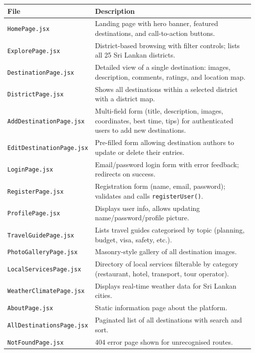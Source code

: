 \documentclass[12pt,a4paper]{report}
\begin{document}
\begin{longtable}{lp{9cm}}
  \toprule
  \textbf{File} & \textbf{Description} \\
  \midrule
  \texttt{HomePage.jsx} & Landing page with hero banner, featured destinations, and call-to-action buttons. \\
  \texttt{ExplorePage.jsx} & District-based browsing with filter controls; lists all 25 Sri Lankan districts. \\
  \texttt{DestinationPage.jsx} & Detailed view of a single destination: images, description, comments, ratings, and location map. \\
  \texttt{DistrictPage.jsx} & Shows all destinations within a selected district with a district map. \\
  \texttt{AddDestinationPage.jsx} & Multi-field form (title, description, images, coordinates, best time, tips) for authenticated users to add new destinations. \\
  \texttt{EditDestinationPage.jsx} & Pre-filled form allowing destination authors to update or delete their entries. \\
  \texttt{LoginPage.jsx} & Email/password login form with error feedback; redirects on success. \\
  \texttt{RegisterPage.jsx} & Registration form (name, email, password); validates and calls \texttt{registerUser()}. \\
  \texttt{ProfilePage.jsx} & Displays user info, allows updating name/password/profile picture. \\
  \texttt{TravelGuidePage.jsx} & Lists travel guides categorised by topic (planning, budget, visa, safety, etc.). \\
  \texttt{PhotoGalleryPage.jsx} & Masonry-style gallery of all destination images. \\
  \texttt{LocalServicesPage.jsx} & Directory of local services filterable by category (restaurant, hotel, transport, tour operator). \\
  \texttt{WeatherClimatePage.jsx} & Displays real-time weather data for Sri Lankan cities. \\
  \texttt{AboutPage.jsx} & Static information page about the platform. \\
  \texttt{AllDestinationsPage.jsx} & Paginated list of all destinations with search and sort. \\
  \texttt{NotFoundPage.jsx} & 404 error page shown for unrecognised routes. \\
  \bottomrule
\end{longtable}
\end{document}
